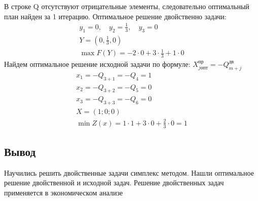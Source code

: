 \documentclass[a4paper, 12pt]{article}
\begin{document}
В строке Q отсутствуют отрицательные элементы, следовательно оптимальный план найден за 1 итерацию. Оптимальное решение двойственно задачи: 
\begin{align*}
  y_1=0,\quad y_2=\frac{1}{3},\quad y_3=0\\
  Y=(0,\frac{1}{3},0)\\
  \max F(Y) = -2\cdot0+3\cdot\frac{1}{3}+1\cdot0
\end{align*}
Найдем оптимальное решение исходной задачи по формуле: $X_{j\text{опт}}^{\text{пр}} = -Q_{m+j}^{\text{дв}}$
\begin{align}
  x_1=-Q_{3+1}=-Q_4=1\\
  x_2=-Q_{3+2}=-Q_5=0\\
  x_3=-Q_{3+3}=-Q_6=0\\
  X=(1;0;0)\\
  \min Z(x)=1\cdot 1+3\cdot0+\frac{2}{3}\cdot0 = 1
\end{align}
\subsection{Вывод}
Научились решить двойственные задачи симплекс методом. Нашли оптимальное решение двойственной и исходной задач. Решение двойственных задач применяется в экономическом анализе
\end{document}

